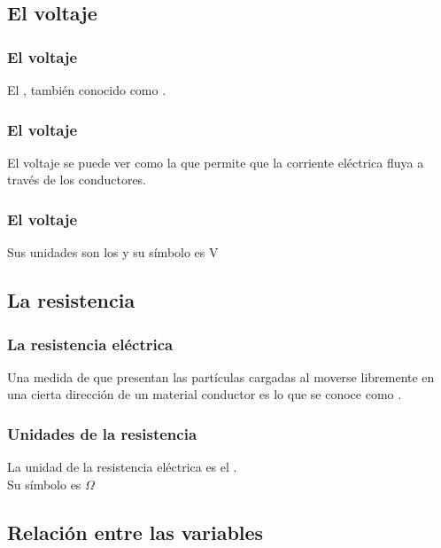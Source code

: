 \documentclass[14pt]{beamer}
\begin{document}
\subsection{El voltaje}

\begin{frame}
\frametitle{El voltaje}
El , \pause también conocido como .
\end{frame}
\begin{frame}
\frametitle{El voltaje}
El voltaje se puede ver como la  que permite que la corriente eléctrica fluya a través de los conductores.
\end{frame}
\begin{frame}
\frametitle{El voltaje}
Sus unidades son los  y su símbolo es \si{\volt}
\end{frame}

\subsection{La resistencia}

\begin{frame}
\frametitle{La resistencia eléctrica}
Una medida de  que presentan las partículas cargadas al moverse libremente en una cierta dirección de un material conductor \pause es lo que se conoce como .
\end{frame}
\begin{frame}
\frametitle{Unidades de la resistencia}
La unidad de la resistencia eléctrica es el .
\\
\bigskip
\pause
Su símbolo es $\Omega$
\end{frame}

\subsection{Relación entre las variables}
\end{document}
